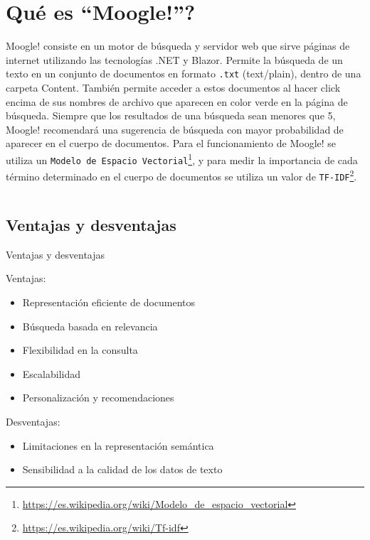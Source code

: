\section{\textquestiondown Qu\'e es ``Moogle!''?}

\begin{frame}
    Moogle! consiste en un motor de búsqueda y servidor web que sirve páginas de internet
utilizando las tecnologías .NET y Blazor. Permite la búsqueda de un texto en un conjunto de
documentos en formato \texttt{.txt} (text/plain), dentro de una carpeta Content. También permite
acceder a estos documentos al hacer click encima de sus nombres de archivo que aparecen en color
verde en la página de búsqueda. Siempre que los resultados de una búsqueda sean menores que 5, Moogle!
recomendará una sugerencia de búsqueda con mayor probabilidad de aparecer en el cuerpo de documentos.
    Para el funcionamiento de Moogle! se utiliza un \texttt{Modelo de Espacio Vectorial}\footnote{
\url{https://es.wikipedia.org/wiki/Modelo_de_espacio_vectorial}}, y para medir la importancia de cada término determinado
en el cuerpo de documentos se utiliza un valor de \texttt{TF-IDF}\footnote{\url{https://es.wikipedia.org/wiki/Tf-idf}}.
\end{frame}


\begin{frame}
    \begin{columns}[t]
        \begin{column}{.5\textwidth}
          \tableofcontents[sections={1-2},currentsection]
        \end{column}
        \begin{column}{.5\textwidth}
          \tableofcontents[sections={3-4},currentsection]
        \end{column}
    \end{columns}
\end{frame}


\subsection{Ventajas y desventajas}
\begin{frame}{Ventajas y desventajas}

Ventajas:
\begin{itemize}
  \item Representación eficiente de documentos
  \item Búsqueda basada en relevancia
  \item Flexibilidad en la consulta
  \item Escalabilidad
  \item Personalización y recomendaciones
\end{itemize}

\pause

Desventajas:
\begin{itemize}
  \item Limitaciones en la representación semántica
  \item Sensibilidad a la calidad de los datos de texto
\end{itemize}

\end{frame}

